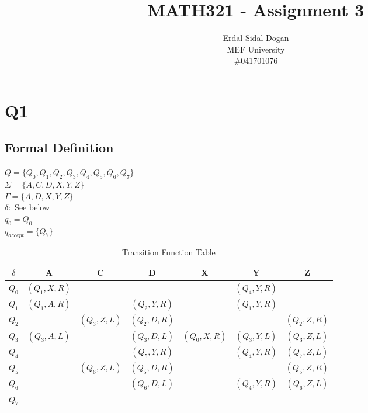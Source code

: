 \documentclass{article}
\title{MATH321 - Assignment 3}
\author{Erdal Sidal Dogan\\ MEF University\\ \#041701076}
\begin{document}
	\maketitle
	\section{Q1}
	\subsection{Formal Definition}
	$Q = \{Q_0, Q_1, Q_2, Q_3, Q_4, Q_5, Q_6, Q_7\}$\\
	$\Sigma = \{A, C, D, X, Y, Z\}$\\
	$\Gamma =  \{A, D, X, Y, Z\}$\\
	$\delta: $ See below\\
	$q_0 = Q_0$\\
	$q_{accept} = \{ Q_7\}$\\
	
	\begin{table}[h]
		\centering
			\begin{tabular}{c|c|c|c|c|c|c}
				$\delta$ & A & C & D & X & Y & Z \\
				\hline
				$Q_0$ & $(Q_1, X, R)$ & & & & $(Q_4, Y, R)$ & \\
				$Q_1$ & $(Q_1, A, R)$  & & $(Q_2, Y, R)$ & & $(Q_1, Y, R)$ & \\
				$Q_2$ & & $(Q_3, Z, L)$ & $(Q_2, D, R)$ & & & $(Q_2, Z, R)$ \\
				$Q_3$ & $(Q_3, A, L)$ & & $(Q_3, D, L)$ & $(Q_0, X, R)$ & $(Q_3, Y, L)$ & $(Q_3, Z, L)$ \\
				$Q_4$ & & & $(Q_5, Y, R)$ & & $(Q_4, Y, R)$&$(Q_7, Z, L)$ \\
				$Q_5$ & & $(Q_6, Z, L)$ & $(Q_5, D, R)$ & & &$(Q_5, Z, R)$ \\
				$Q_6$ & & & $(Q_6, D, L)$ & & $(Q_4, Y, R)$ & $(Q_6, Z, L)$ \\
				$Q_7$ & & & & & & \\
		\end{tabular}
		\caption{Transition Function Table}
	\end{table}
	
\end{document}

